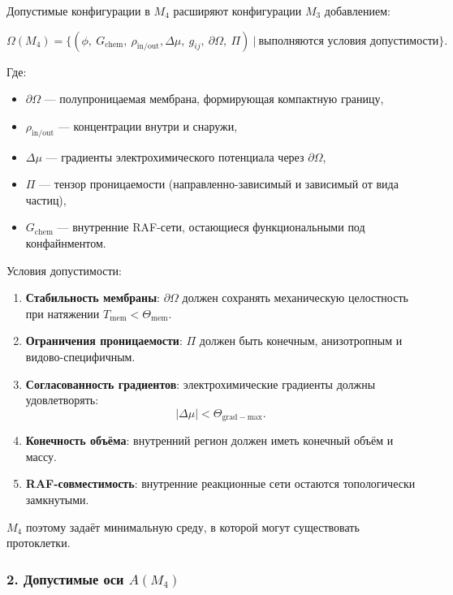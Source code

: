 Допустимые конфигурации в $M_4$ расширяют конфигурации $M_3$ добавлением:

\[
\Omega(M_4)
=
\Big\{
(\phi,\ G_{\mathrm{chem}},\ \rho_{\mathrm{in/out}},
\Delta\mu,\ g_{ij},\ \partial\Omega,\ \Pi)
\ \Big|\ \text{выполняются условия допустимости}
\Big\}.
\]

Где:

\begin{itemize}
    \item $\partial\Omega$ — полупроницаемая мембрана, формирующая компактную границу,
    \item $\rho_{\mathrm{in/out}}$ — концентрации внутри и снаружи,
    \item $\Delta\mu$ — градиенты электрохимического потенциала через $\partial\Omega$,
    \item $\Pi$ — тензор проницаемости (направленно-зависимый и зависимый от вида частиц),
    \item $G_{\mathrm{chem}}$ — внутренние RAF-сети, остающиеся функциональными
          под конфайнментом.
\end{itemize}

Условия допустимости:

\begin{enumerate}
    \item \textbf{Стабильность мембраны}:
    $\partial\Omega$ должен сохранять механическую целостность при
    натяжении
    $T_{\mathrm{mem}} < \Theta_{\mathrm{mem}}$.

    \item \textbf{Ограничения проницаемости}:
    $\Pi$ должен быть конечным, анизотропным и видово-специфичным.

    \item \textbf{Согласованность градиентов}:
    электрохимические градиенты должны удовлетворять:
    \[
    |\Delta\mu| < \Theta_{\mathrm{grad-max}}.
    \]

    \item \textbf{Конечность объёма}:
    внутренний регион должен иметь конечный объём и массу.

    \item \textbf{RAF-совместимость}:
    внутренние реакционные сети остаются топологически замкнутыми.
\end{enumerate}

$M_4$ поэтому задаёт минимальную среду, в которой могут существовать
протоклетки.

\subsubsection*{2. Допустимые оси \texorpdfstring{$A(M_4)$}{A(M_4)}}

